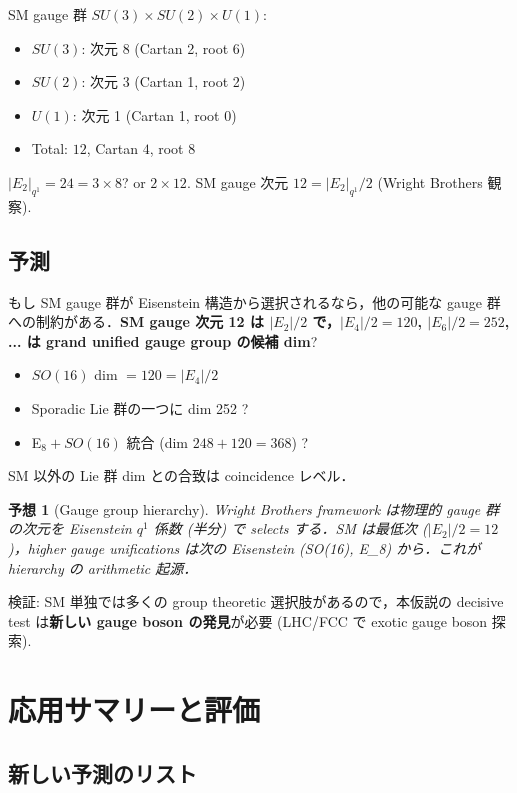 \documentclass[11pt,a4paper]{article}
\newtheorem{conjecture}{予想}
\begin{document}
SM gauge 群 $SU(3) \times SU(2) \times U(1)$:
\begin{itemize}
\item $SU(3)$: 次元 8 (Cartan 2, root 6)
\item $SU(2)$: 次元 3 (Cartan 1, root 2)
\item $U(1)$: 次元 1 (Cartan 1, root 0)
\item Total: $12$, Cartan $4$, root $8$
\end{itemize}

$|E_2|_{q^1} = 24 = 3 \times 8$?  or $2 \times 12$. SM gauge 次元
$12 = |E_2|_{q^1}/2$ (Wright Brothers 観察).

\subsection{予測}

もし SM gauge 群が Eisenstein 構造から選択されるなら，他の可能な gauge
群への制約がある．\textbf{SM gauge 次元 12 は $|E_2|/2$ で，$|E_4|/2 =
120$, $|E_6|/2 = 252$, ... は grand unified gauge group の候補 dim}?

\begin{itemize}
\item $SO(16)$ dim $= 120 = |E_4|/2$
\item Sporadic Lie 群の一つに dim 252 ?
\item E$_8 + SO(16)$ 統合 (dim $248 + 120 = 368$) ?
\end{itemize}

SM 以外の Lie 群 dim との合致は coincidence レベル．

\begin{conjecture}[Gauge group hierarchy]
Wright Brothers framework は物理的 gauge 群の次元を Eisenstein $q^1$
係数 (半分) で selects する．SM は最低次 ($|E_2|/2 = 12$)，higher
gauge unifications は次の Eisenstein (SO(16), E_8) から．これが
hierarchy の arithmetic 起源．
\end{conjecture}

検証: SM 単独では多くの group theoretic 選択肢があるので，本仮説の
decisive test は\textbf{新しい gauge boson の発見}が必要 (LHC/FCC で
exotic gauge boson 探索).

\section{応用サマリーと評価}

\subsection{新しい予測のリスト}
\end{document}
